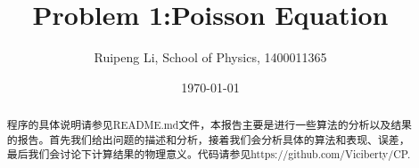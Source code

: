 \documentclass[letterpaper,12pt]{article}
\begin{document}
\title{Problem 1:Poisson Equation}
\author{Ruipeng Li, School of Physics, 1400011365}
\date{\today}
\maketitle

\begin{abstract}	

程序的具体说明请参见README.md文件，本报告主要是进行一些算法的分析以及结果的报告。首先我们给出问题的描述和分析，接着我们会分析具体的算法和表现、误差，最后我们会讨论下计算结果的物理意义。代码请参见https://github.com/Viciberty/CP.

\end{abstract}
\end{document}
